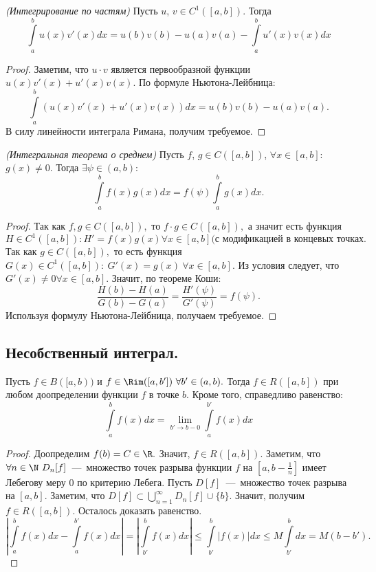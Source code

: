 \begin{theorem}
    \textit{(Интегрирование по частям)} Пусть $u$, $v \in C^1([a, b]).$ Тогда 
    $$\int \limits_a^b u(x) v'(x) dx = u(b) v(b) - u(a) v(a) - \int \limits_{a}^{b}u'(x) v(x) dx$$
\end{theorem}

\begin{proof}
    Заметим, что $u \cdot v$ является первообразной функции $u(x) v'(x) + u'(x) v(x).$ По формуле Ньютона-Лейбница:
    $$\int \limits_a^b (u(x) v'(x) + u'(x) v(x)) dx = u(b) v(b) - u(a) v(a).$$
    В силу линейности интеграла Римана, получим требуемое.
\end{proof}

\begin{theorem}
    \textit{(Интегральная теорема о среднем)} Пусть $f$, $g \in C([a, b])$, $\forall x \in [a, b]$: $g(x) \neq 0$. Тогда $\exists \psi \in (a, b)$:
    $$\int \limits_a^b f(x) g(x) dx = f(\psi) \int \limits_a^b g(x) dx.$$
\end{theorem}

\begin{proof}
    Так как $f, g \in C([a, b]),$ то $f \cdot g \in C([a, b]),$ а значит есть функция $H \in C^1([a, b]): H' = f(x) g(x) \forall x \in [a, b] \text{(с модификацией в концевых точках}.$ Так как $g \in C([a, b]),$ то есть функция $G(x) \in C^1([a, b]): \ G'(x) = g(x) \ \forall x \in [a, b].$ Из условия следует, что $G'(x) \neq 0 \forall x \in [a, b].$ Значит, по теореме Коши:
    $$\frac{H(b) - H(a)}{G(b) - G(a)} = \frac{H'(\psi)}{G'(\psi)} = f(\psi).$$
    Используя формулу Ньютона-Лейбница, получаем требуемое.
\end{proof}

\subsection{Несобственный интеграл.}

\begin{theorem}
    Пусть $f \in B([a, b))$ и $f \in \Rim([a, b']) \  \forall b' \in (a, b).$ Тогда $f \in R([a, b])$ при любом доопределении функции $f$ в точке $b.$ Кроме того, справедливо равенство:
    $$\int \limits_a^b f(x) dx = \lim_{b' \to b-0} \int \limits_a^{b'} f(x) dx$$
\end{theorem}

\begin{proof}
    Доопределим $f(b) = C \in \R.$ Значит, $f \in R([a, b]).$ Заметим, что $\forall n \in \N \ D_n[f]$~---~множество точек разрыва функции $f$ на $[a, b - \frac{1}{n}]$ имеет Лебегову меру $0$ по критерию Лебега. Пусть $D[f]$~---~множество точек разрыва на $[a, b].$ Заметим, что $D[f] \subset \bigcup_{n = 1}^{\infty} D_n[f] \cup \{b\}.$ Значит, получим $f \in R([a, b])$. Осталось доказать равенство.
    $$\left|\int \limits_a^b f(x) dx - \int \limits_a^{b'} f(x) dx\right| = \left|\int \limits_{b'}^b f(x) dx\right| \leq \int \limits_{b'}^b \left|f(x)\right| dx \leq M \int \limits_{b'}^b dx = M(b - b').$$
\end{proof}

